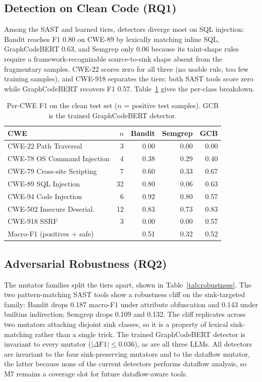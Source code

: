 \subsection{Detection on Clean Code (RQ1)}

Among the SAST and learned tiers, detectors diverge most on SQL injection: Bandit
reaches F1 0.80 on CWE-89 by lexically matching inline SQL, GraphCodeBERT 0.63,
and Semgrep only 0.06 because its taint-shape rules require a
framework-recognizable source-to-sink shape absent from the fragmentary samples.
CWE-22 scores zero for all three (no usable rule, too few training samples), and
CWE-918 separates the tiers: both SAST tools score zero while GraphCodeBERT
recovers F1 0.57. Table~\ref{tab:clean-percwe} gives the per-class breakdown.

\begin{table}[htb]
\caption{Per-CWE F1 on the clean test set ($n$ = positive test samples). GCB is
the trained GraphCodeBERT detector.}
\label{tab:clean-percwe}
\centering
\begin{tabular}{lrrrr}
\toprule
\textbf{CWE} & $n$ & \textbf{Bandit} & \textbf{Semgrep} & \textbf{GCB} \\
\midrule
CWE-22  Path Traversal       &  3 & 0.00 & 0.00 & 0.00 \\
CWE-78  OS Command Injection &  4 & 0.38 & 0.29 & 0.40 \\
CWE-79  Cross-site Scripting &  7 & 0.60 & 0.33 & 0.67 \\
CWE-89  SQL Injection        & 32 & 0.80 & 0.06 & 0.63 \\
CWE-94  Code Injection       &  6 & 0.92 & 0.80 & 0.57 \\
CWE-502 Insecure Deserial.   & 12 & 0.83 & 0.73 & 0.83 \\
CWE-918 SSRF                 &  3 & 0.00 & 0.00 & 0.57 \\
\midrule
Macro-F1 (positives $+$ safe) &   & 0.51 & 0.32 & 0.52 \\
\bottomrule
\end{tabular}
\end{table}

\subsection{Adversarial Robustness (RQ2)}

The mutator families split the tiers apart, shown in
Table~\ref{tab:robustness}. The two pattern-matching SAST tools show a robustness
cliff on the sink-targeted family: Bandit drops 0.187 macro-F1 under attribute
obfuscation and 0.143 under builtins indirection; Semgrep drops 0.109 and 0.132.
The cliff replicates across two mutators attacking disjoint sink classes, so it
is a property of lexical sink-matching rather than a single trick. The trained
GraphCodeBERT detector is invariant to every mutator ($|\Delta\textrm{F1}|\le
0.036$), as are all three LLMs. All detectors are invariant to the four
sink-preserving mutators and to the dataflow mutator, the latter because none of
the current detectors performs dataflow analysis, so M7 remains a coverage slot
for future dataflow-aware tools.

